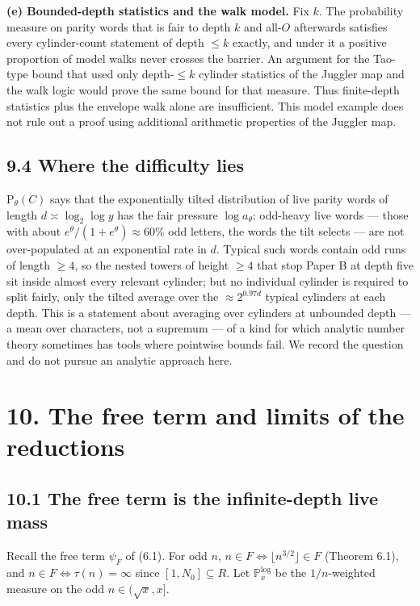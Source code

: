 \documentclass[11pt,a4paper]{article}
\begin{document}
\textbf{(e) Bounded-depth statistics and the walk model.} Fix \(k\). The
probability measure on parity words that is fair to depth \(k\) and
all-\(O\) afterwards satisfies every cylinder-count statement of depth
\(\le k\) exactly, and under it a positive proportion of model walks
never crosses the barrier. An argument for the Tao-type bound that used
only depth-\(\le k\) cylinder statistics of the Juggler map and the walk
logic would prove the same bound for that measure. Thus finite-depth
statistics plus the envelope walk alone are insufficient. This model
example does not rule out a proof using additional arithmetic properties
of the Juggler map.

\subsection{9.4 Where the difficulty
lies}\label{where-the-difficulty-lies}

\(\mathrm P_\theta(C)\) says that the exponentially tilted distribution
of live parity words of length \(d\asymp\log_2\log y\) has the fair
pressure \(\log a_\theta\): odd-heavy live words --- those with about
\(e^\theta/(1+e^\theta)\approx 60\%\) odd letters, the words the tilt
selects --- are not over-populated at an exponential rate in \(d\).
Typical such words contain odd runs of length \(\ge 4\), so the nested
towers of height \(\ge 4\) that stop Paper B at depth five sit inside
almost every relevant cylinder; but no individual cylinder is required
to split fairly, only the tilted average over the \(\approx 2^{0.97d}\)
typical cylinders at each depth. This is a statement about averaging
over cylinders at unbounded depth --- a mean over characters, not a
supremum --- of a kind for which analytic number theory sometimes has
tools where pointwise bounds fail. We record the question and do not
pursue an analytic approach here.

\section{10. The free term and limits of the
reductions}\label{the-free-term-and-limits-of-the-reductions}

\subsection{10.1 The free term is the infinite-depth live
mass}\label{the-free-term-is-the-infinite-depth-live-mass}

Recall the free term \(\psi_F\) of (6.1). For odd \(n\),
\(n\in F\iff\lfloor n^{3/2}\rfloor\in F\) (Theorem 6.1), and
\(n\in F\iff\tau(n)=\infty\) since \([1,N_0]\subseteq R\). Let
\(\mathbb P^{\log}_x\) be the \(1/n\)-weighted measure on the odd
\(n\in(\sqrt x,x]\).
\end{document}
